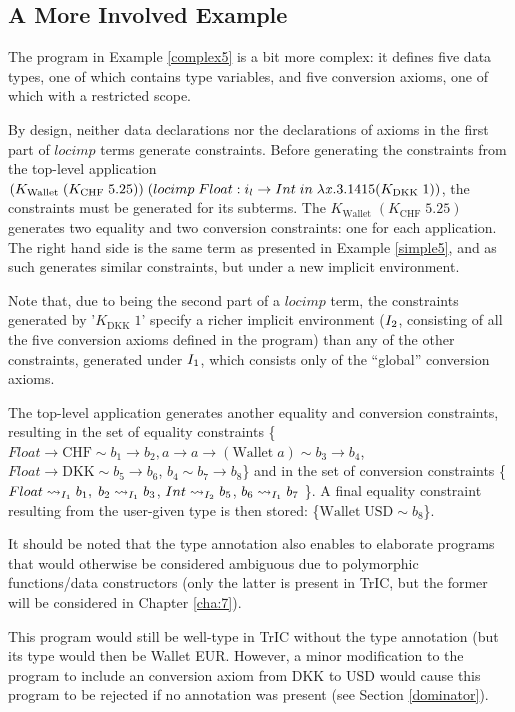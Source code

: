 \subsection{A More Involved Example}
The program in Example \ref{complex5} is a bit more complex: it defines five data types, one of which contains type variables, and five conversion axioms, one of which with a restricted scope.

By design, neither data declarations nor the declarations of axioms in the first part of $locimp$ terms generate constraints. Before generating the constraints from the top-level application $(K_{\text{Wallet}}\;(K_{\text{CHF}}\; 5.25)) \;(\monolocal{i_l}{Int}{Float}{\lambda \tmVar.3.1415} (K_{\text{DKK}}\;1))$, the constraints must be generated for its subterms. The $K_{\text{Wallet}}\;(K_{\text{CHF}}\; 5.25)$ generates two equality and two conversion constraints: one for each application. The right hand side is the same term as presented in Example \ref{simple5}, and as such generates similar constraints, but under a new implicit environment.

Note that, due to being the second part of a $locimp$ term, the constraints generated by '$K_{\text{DKK}}\;1$' specify a richer implicit environment ($\imEnv_2$, consisting of all the five conversion axioms defined in the program) than any of the other constraints, generated under $\imEnv_1$, which consists only of the ``global'' conversion axioms.

The top-level application generates another equality and conversion constraints, resulting in the set of equality constraints \{$Float\to \text{CHF} \sim b_1 \to b_2, a \to a \to (\text{Wallet} \; a) \sim b_3 \to b_4$, $Float \to \text{DKK} \sim b_5 \to b_6$, $b_4 \sim b_7 \to b_8$\} and in the set of conversion constraints \{$\convX{\imEnv_1}{Float}{b_1},\; \convX{\imEnv_1}{b_2}{b_3}$,\; $\convX{\imEnv_2}{Int}{b_5}$,\; $\convX{\imEnv_1}{b_6}{b_7}$ \}. A final equality constraint resulting from the user-given type is then stored: \{$\text{Wallet} \; \text{USD} \sim b_8$\}.

It should be noted that the type annotation also enables to elaborate programs that would otherwise be considered ambiguous due to polymorphic functions/data constructors (only the latter is present in TrIC, but the former will be considered in Chapter \ref{cha:7}).

This program would still be well-type in TrIC without the type annotation (but its type would then be Wallet EUR. However, a minor modification to the program to include an conversion axiom from $\text{DKK}$ to $\text{USD}$ would cause this program to be rejected if no annotation was present (see Section \ref{dominator}).


